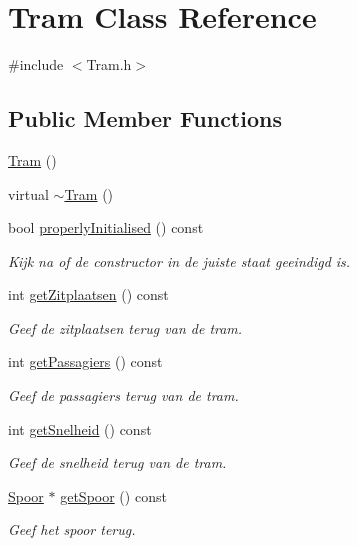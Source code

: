 \hypertarget{class_tram}{}\section{Tram Class Reference}
\label{class_tram}


{\ttfamily \#include $<$Tram.\+h$>$}

\subsection*{Public Member Functions}
\begin{DoxyCompactItemize}
\item 
\hyperlink{class_tram_aad83b2e7e79d57528691bf317ab0e1ef}{Tram} ()
\item 
virtual \hyperlink{class_tram_acd6056d2289f2dccd371bc226cd2cb17}{$\sim$\+Tram} ()
\item 
bool \hyperlink{class_tram_ac2688f590e4db232b4f535c9bf959efb}{properly\+Initialised} () const
\begin{DoxyCompactList}\small\item\em Kijk na of de constructor in de juiste staat geeindigd is. \end{DoxyCompactList}\item 
int \hyperlink{class_tram_abcb1ce0d10e394fce8a99b460e5104de}{get\+Zitplaatsen} () const
\begin{DoxyCompactList}\small\item\em Geef de zitplaatsen terug van de tram. \end{DoxyCompactList}\item 
int \hyperlink{class_tram_a678ba2cd0c6ab76e966947944f599d56}{get\+Passagiers} () const
\begin{DoxyCompactList}\small\item\em Geef de passagiers terug van de tram. \end{DoxyCompactList}\item 
int \hyperlink{class_tram_aa8bcd980469801cb8524f170006f666c}{get\+Snelheid} () const
\begin{DoxyCompactList}\small\item\em Geef de snelheid terug van de tram. \end{DoxyCompactList}\item 
\hyperlink{class_spoor}{Spoor} $\ast$ \hyperlink{class_tram_aee9cf13e0525ac7c769709edf1ff987d}{get\+Spoor} () const
\begin{DoxyCompactList}\small\item\em Geef het spoor terug. \end{DoxyCompactList}\item 

\end{DoxyCompactItemize}
